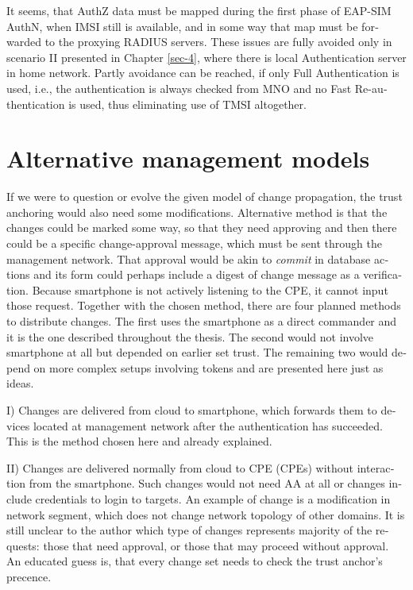 \documentclass[12pt,a4paper,english]{tutthesis}
\begin{document}
\begin{otherlanguage}{english}
It seems, that AuthZ data must be mapped during the first phase of
EAP-SIM AuthN, when IMSI still is available, and in some way
that map must be forwarded to the proxying RADIUS servers.
These issues are fully avoided only in scenario II presented in Chapter
\ref{sec-4}, where there is local Authentication server in home network.
Partly avoidance can be reached, if only Full Authentication is
used, i.e., the authentication is always checked from MNO and no Fast
Re-authentication is used, thus eliminating use of TMSI altogether.





\section{Alternative management models}
\label{sec-6-6}

If we were to question or evolve the given model of change
propagation, the trust anchoring would also need some modifications.
Alternative method is that the changes could be marked some way, so
that they need approving and then there could be a specific
change-approval message, which must be sent through the management
network. That approval would be akin to \emph{commit} in database actions
and its form could perhaps include a digest of change message as a verification.
Because smartphone is not actively listening to the CPE, it cannot input
those request. Together with the chosen method, there are four planned
methods to distribute changes. The first uses the smartphone as a
direct commander and it is the one described throughout the thesis.
The second would not involve smartphone at all but depended on
earlier set trust. The remaining two would depend on more complex
setups involving tokens and are presented here just as ideas.


I) Changes are delivered from cloud to smartphone, which forwards them
   to devices located at management network after the
   authentication has succeeded. This is the method chosen here and
   already explained.

II) Changes are delivered normally from cloud to CPE (CPEs) without
   interaction from the smartphone. Such changes would not need AA at
   all or changes include credentials to login to targets. An example
   of change is a modification in network segment, which does not
   change network topology of other domains.  It is still unclear to
   the author which type of changes represents majority of the
   requests: those that need approval, or those that may proceed
   without approval. An educated guess is, that every change set needs
   to check the trust anchor's precence.




\end{otherlanguage}
\end{document}
